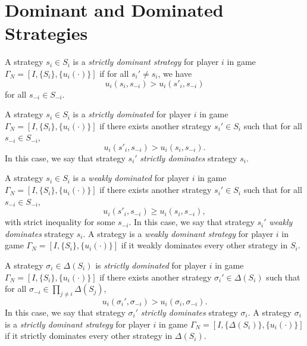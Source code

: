 \addtocounter{section}{1}

\section{Dominant and Dominated Strategies}

\begin{defn}
    A strategy $s_i \in S_i$ is a \emph{strictly dominant strategy} for player $i$ in game $\Gamma_N = [I, \{S_i\}, \{u_i(\cdot)\}]$ if for all $s_i' \neq s_i$, we have
    \begin{equation*}
        u_i (s_i, s_{-i}) > u_i (s'_i, s_{-i})
    \end{equation*}
    for all $s_{-i} \in S_{-i}$.
\end{defn}

\begin{defn}
    A strategy $s_i \in S_i$ is a \emph{strictly dominated} for player $i$ in game $\Gamma_N = [I, \{S_i\}, \{u_i(\cdot)\}]$ if there exists another strategy $s_i' \in S_i$ such that for all $s_{-i} \in S_{-i}$,
    \begin{equation*}
        u_i (s'_i, s_{-i}) > u_i (s_i, s_{-i}).
    \end{equation*}
    In this case, we say that strategy $s_i'$ \emph{strictly dominates} strategy $s_i$.
\end{defn}

\begin{defn}
    A strategy $s_i \in S_i$ is a \emph{weakly dominated} for player $i$ in game $\Gamma_N = [I, \{S_i\}, \{u_i(\cdot)\}]$ if there exists another strategy $s_i' \in S_i$ such that for all $s_{-i} \in S_{-i}$,
    \begin{equation*}
        u_i (s'_i, s_{-i}) \geq u_i (s_i, s_{-i}),
    \end{equation*}
    with strict inequality for some $s_{-i}$. In this case, we say that strategy $s_i'$ \emph{weakly dominates} strategy $s_i$. A strategy is a \emph{weakly dominant strategy} for player $i$ in game $\Gamma_N = [I, \{S_i\}, \{u_i(\cdot)\}]$ if it weakly dominates every other strategy in $S_i$.
\end{defn}

\begin{defn}
    A strategy $\sigma_i \in \Delta(S_i)$ is \emph{strictly dominated} for player $i$ in game $\Gamma_N = [I, \{S_i\}, \{u_i(\cdot)\}]$ if there exists another strategy $\sigma_i' \in \Delta(S_i)$ such that for all $\sigma_{-i} \in \prod_{j \neq i} \Delta(S_j)$,
    \begin{equation*}
        u_i (\sigma_i', \sigma_{-i}) > u_i (\sigma_i, \sigma_{-i}).
    \end{equation*}
    In this case, we say that strategy $\sigma_i'$ \emph{strictly dominates} strategy $\sigma_i$. A strategy $\sigma_i$ is a \emph{strictly dominant strategy} for player $i$ in game $\Gamma_N = [I, \{\Delta(S_i)\}, \{u_i(\cdot)\}]$ if it strictly dominates every other strategy in $\Delta(S_i)$.
\end{defn}

